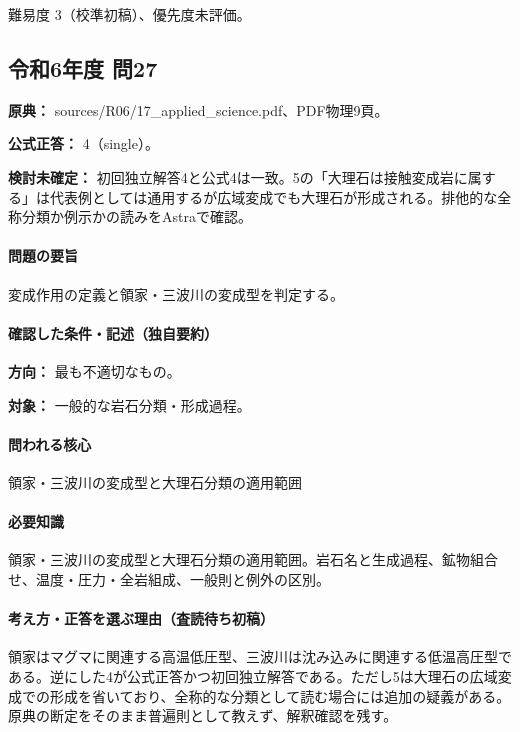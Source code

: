 \par 難易度 3（校準初稿）、優先度未評価。

\subsection{令和6年度 問27}
\label{q:r06-reg-applied-27}

\noindent\textbf{原典：} sources/R06/17\_applied\_science.pdf、PDF物理9頁。

\textbf{公式正答：} 4（single）。

\par\textbf{検討未確定：} 初回独立解答4と公式4は一致。5の「大理石は接触変成岩に属する」は代表例としては通用するが広域変成でも大理石が形成される。排他的な全称分類か例示かの読みをAstraで確認。

\paragraph{問題の要旨} 変成作用の定義と領家・三波川の変成型を判定する。

\paragraph{確認した条件・記述（独自要約）}\mbox{}\par

\noindent\textbf{方向：} 最も不適切なもの。\par

\noindent\textbf{対象：} 一般的な岩石分類・形成過程。\par

\paragraph{問われる核心} 領家・三波川の変成型と大理石分類の適用範囲

\paragraph{必要知識} 領家・三波川の変成型と大理石分類の適用範囲。岩石名と生成過程、鉱物組合せ、温度・圧力・全岩組成、一般則と例外の区別。

\paragraph{考え方・正答を選ぶ理由（査読待ち初稿）} 領家はマグマに関連する高温低圧型、三波川は沈み込みに関連する低温高圧型である。逆にした4が公式正答かつ初回独立解答である。ただし5は大理石の広域変成での形成を省いており、全称的な分類として読む場合には追加の疑義がある。原典の断定をそのまま普遍則として教えず、解釈確認を残す。

